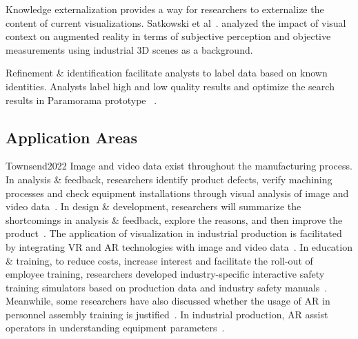 \documentclass[a4paper,fleqn]{cas-dc}
\begin{document}
Knowledge externalization provides a way for researchers to externalize the content of current visualizations. 
Satkowski et al~\cite{Satkowski2021}. analyzed the impact of visual context on augmented reality in terms of subjective perception and objective measurements using industrial 3D scenes as a background.

Refinement \& identification facilitate analysts to label data based on known identities.
Analysts label high and low quality results and optimize the search results in Paramorama prototype~\cite{Pretorius2011} .  

\subsection{Application Areas}Townsend2022
Image and video data exist throughout the manufacturing process.
In analysis \& feedback, researchers identify product defects, verify machining processes and check equipment installations through visual analysis of image and video data~\cite{Cirp2019,Murithi2020,tao2020machining}. 
In design \& development, researchers will summarize the shortcomings in analysis \& feedback, explore the reasons, and then improve the product~\cite{Townsend2022}.
The application of visualization in industrial production is facilitated by integrating VR and AR technologies with image and video data~\cite{hamid2014virtual,Satkowski2021}. 
In education \& training, to reduce costs, increase interest and facilitate the roll-out of employee training, researchers developed industry-specific interactive safety training simulators based on production data and industry safety manuals~\cite{Moreland2019}. Meanwhile, some researchers have also discussed whether the usage of AR in personnel assembly training is justified~\cite{buttner2020augmented}.
In industrial production, AR assist operators in understanding equipment parameters~\cite{Murithi2020,Satkowski2021}.
\end{document}
